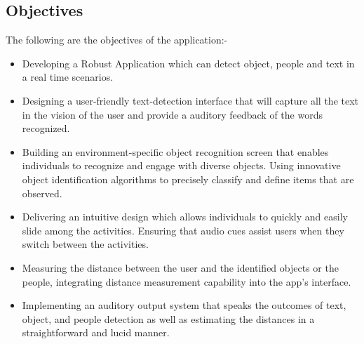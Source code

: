 \documentclass[MScCS]{uccthesis}
\begin{document}
   \subsection{Objectives}
   The following are the objectives of the application:-
   \begin{itemize}
       \item Developing a Robust Application which can detect object, people and text in a real time scenarios.
       \item Designing a user-friendly text-detection interface that will capture all the text in the vision of the user and provide a auditory feedback of the words recognized. 
       \item Building an environment-specific object recognition screen that enables individuals to recognize and engage with diverse objects. Using innovative object identification algorithms to precisely classify and define items that are observed.
       \item Delivering an intuitive design which allows individuals to quickly and easily slide among the activities. Ensuring that audio cues assist users when they switch between the activities.
       \item Measuring the distance between the user and the identified objects or the people, integrating distance measurement capability into the app's interface. 
       \item Implementing an auditory output system that speaks the outcomes of text, object, and people detection as well as estimating the distances in a straightforward and lucid manner. 

   \end{itemize}
\end{document}
